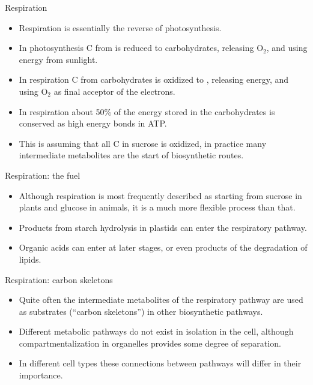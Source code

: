 \documentclass[10pt]{beamer}
\begin{document}
\begin{frame}{Respiration}
    \begin{itemize}
        \item Respiration is essentially the reverse of
        photosynthesis.
        \item In photosynthesis C from \COtwo is reduced to
        carbohydrates, releasing O$_2$, and using energy from
        sunlight.
        \item In respiration C from carbohydrates is oxidized to
        \COtwo, releasing energy, and using O$_2$ as final acceptor
        of the electrons.
        \item In respiration about 50\% of the energy stored in
        the carbohydrates is conserved as high energy bonds in ATP.
        \item This is assuming that all C in sucrose is oxidized,
        in practice many intermediate metabolites are the start of
        biosynthetic routes.
    \end{itemize}
\end{frame}

\begin{frame}{Respiration: the fuel}
    \begin{itemize}
        \item Although respiration is most frequently described
        as starting from sucrose in plants and glucose in animals,
        it is a much more flexible process than that.
        \item Products from starch hydrolysis in plastids can
        enter the respiratory pathway.
        \item Organic acids can enter at later stages, or even
        products of the degradation of lipids.
    \end{itemize}
\end{frame}

\begin{frame}{Respiration: carbon skeletons}
    \begin{itemize}
        \item Quite often the intermediate metabolites of the
        respiratory pathway are
        used as substrates (``carbon skeletons'') in other biosynthetic pathways.
        \item Different metabolic pathways do not exist in
        isolation in the cell, although compartmentalization in
        organelles provides some degree of separation.
        \item In different cell types these connections between pathways
        will differ in their importance.
    \end{itemize}
\end{frame}
\end{document}

